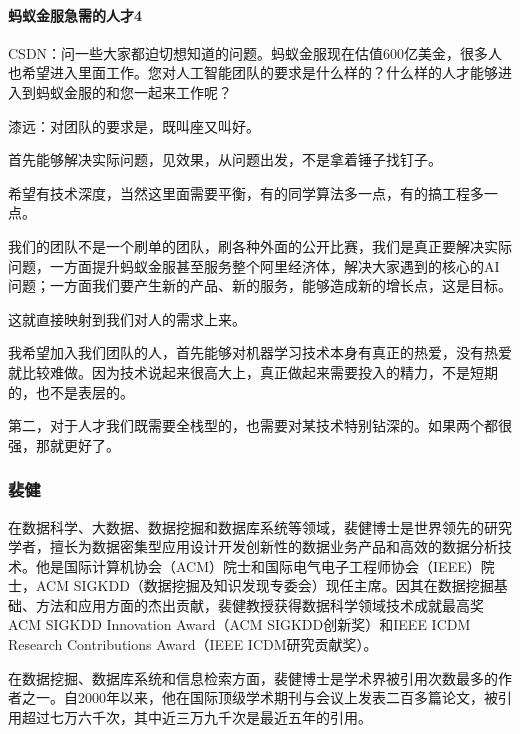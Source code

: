 \documentclass[letterpaper,10pt,english]{sphinxmanual}
\begin{document}
\paragraph{蚂蚁金服急需的人才4\sphinxfootnotemark[1086]}
\label{\detokenize{chapter_AI_expert/qi_yuan:id9}}%
\begin{footnotetext}[1086]\sphinxAtStartFootnote
{}
%
\end{footnotetext}\ignorespaces 
CSDN：问一些大家都迫切想知道的问题。蚂蚁金服现在估值600亿美金，很多人也希望进入里面工作。您对人工智能团队的要求是什么样的？什么样的人才能够进入到蚂蚁金服的和您一起来工作呢？

漆远：对团队的要求是，既叫座又叫好。

首先能够解决实际问题，见效果，从问题出发，不是拿着锤子找钉子。

希望有技术深度，当然这里面需要平衡，有的同学算法多一点，有的搞工程多一点。

我们的团队不是一个刷单的团队，刷各种外面的公开比赛，我们是真正要解决实际问题，一方面提升蚂蚁金服甚至服务整个阿里经济体，解决大家遇到的核心的AI问题；一方面我们要产生新的产品、新的服务，能够造成新的增长点，这是目标。

这就直接映射到我们对人的需求上来。

我希望加入我们团队的人，首先能够对机器学习技术本身有真正的热爱，没有热爱就比较难做。因为技术说起来很高大上，真正做起来需要投入的精力，不是短期的，也不是表层的。

第二，对于人才我们既需要全栈型的，也需要对某技术特别钻深的。如果两个都很强，那就更好了。


\subsubsection{裴健}
\label{\detokenize{chapter_AI_expert/pei_jian:id1}}\label{\detokenize{chapter_AI_expert/pei_jian::doc}}
在数据科学、大数据、数据挖掘和数据库系统等领域，裴健博士是世界领先的研究学者，擅长为数据密集型应用设计开发创新性的数据业务产品和高效的数据分析技术。他是国际计算机协会（ACM）院士和国际电气电子工程师协会（IEEE）院士，ACM
SIGKDD（数据挖掘及知识发现专委会）现任主席。因其在数据挖掘基础、方法和应用方面的杰出贡献，裴健教授获得数据科学领域技术成就最高奖ACM
SIGKDD Innovation Award（ACM SIGKDD创新奖）和IEEE ICDM Research
Contributions Award（IEEE ICDM研究贡献奖）。

在数据挖掘、数据库系统和信息检索方面，裴健博士是学术界被引用次数最多的作者之一。自2000年以来，他在国际顶级学术期刊与会议上发表二百多篇论文，被引用超过七万六千次，其中近三万九千次是最近五年的引用。
\end{document}
